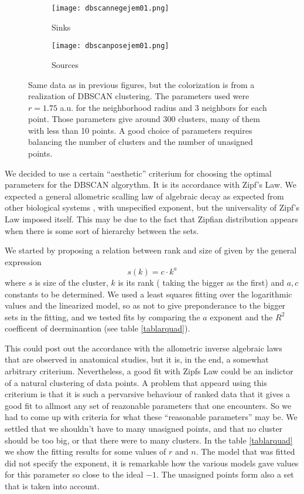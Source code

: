\documentclass{article}
\begin{document}
\begin{figure}[h]
\centering
\begin{subfigure}{0.40\textwidth}
\texttt{[image: dbscannegejem01.png]}
\caption{Sinks}
\end{subfigure}
\begin{subfigure}{0.40\textwidth}
\texttt{[image: dbscanposejem01.png]}
\caption{Sources}
\end{subfigure}

\caption{Same data as in previous figures, but the colorization is
  from a realization of DBSCAN clustering. The parameters used were
  $r=1.75$ a.u. for the neighborhood radius and 3 neighbors for each point.
  Those parameters give around 300 clusters, many of them with less than
  10 points. A good choice of parameters requires balancing
  the number of clusters and the number of unasigned points. 
}\label{puntoscluster}


\end{figure}


We decided to use a certain ``aesthetic'' criterium for choosing the optimal parameters
for the DBSCAN algorythm.  It is its accordance with Zipf's Law. We expected
a general allometric scalling law of algebraic decay as expected
from other biological systems \cite{WestBrown2004, West99}, with unspecified
exponent, but the universality of Zipf's Law imposed itself. This may be
due to the fact that Zipfian distribution appears when there is some
sort of hierarchy between the sets.

We started by proposing a
relation between rank and size of given by the general expression
\begin{equation}
s(k)=c \cdot k^a 
\end{equation}
where $s$ is size of the cluster, $k$ is its rank ( taking the bigger as the
first) and $a, c$ constants to be determined. We used a least squares fitting
over the logarithmic values and the linearized model, so as not to give
preponderance to the bigger sets in the fitting, and we tested fits by
comparing the $a$ exponent and the $R^2$ coefficent of deerminantion (see table
\ref{tablarquad}).

This could post out
the accordance with the allometric inverse algebraic laws that are observed in
anatomical studies, but it is, in the end, a somewhat arbitrary criterium.
Nevertheless, a good
fit with Zipfs Law could be an indictor of a natural clustering of data points.
A problem that appeard using this criterium is that it is such a pervarsive
behaviour of ranked data
that it gives a good fit to allmost any set of reazonable parameters
that one encounters. So we had to come up with criteria for what these ``reasonable
parameters'' may be.  We settled that we shouldn't have to many unasigned points, and
that no cluster should be too big, or that there were to many clusters. In the
table \ref{tablarquad} we show the fitting results for some values of
$r$ and $n$. The model that was fitted did not specify the exponent, it
is remarkable how the various models gave values for this parameter so close
to the ideal $-1$. The unasigned points form also a set that is taken into
account. 
\end{document}
